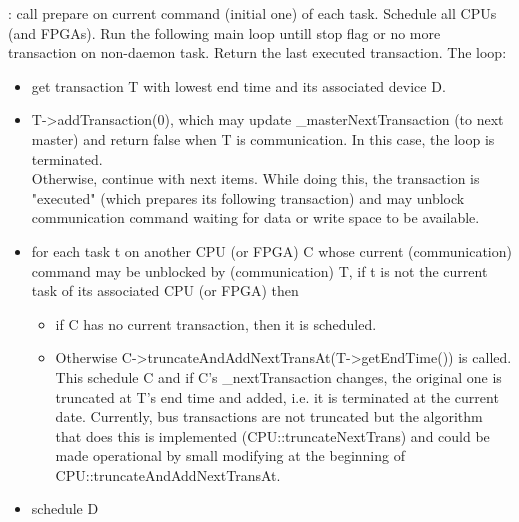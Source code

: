\documentclass[a4paper,11pt]{article}
\newcommand{\bfont}{\fontseries{b}\selectfont}
\newcommand{\cod}[1]{{\ttfamily #1}}
\newcommand{\method}[1]{\par\vspace{1mm}\hspace{-2mm}\colorbox{method}{\textopenbullet\bfont\cod{#1}:}}
\begin{document}
\method{simulate(oLastTrans)} call \cod{prepare} on current command (initial one) of each task. Schedule all CPUs (and FPGAs). Run the following main loop untill stop flag or no more transaction on non-daemon task. Return the last executed transaction. The loop:
\begin{itemize}
	\item get transaction \cod{T} with lowest end time and its associated device \cod{D}.
	\item \cod{T->addTransaction(0)}, which may update \cod{\_masterNextTransaction} (to next master) and return false when \cod{T} is communication. In this case, the loop is terminated.\\
	Otherwise, continue with next items. While doing this, the transaction is "executed" (which prepares its following transaction) and may unblock communication command waiting for data or write space to be available.
	\item for each task \cod{t} on another CPU (or FPGA) \cod{C} whose current (communication) command may be unblocked by (communication) \cod{T}, if \cod{t} is not the current task of its associated CPU (or FPGA) then
	\begin{itemize}
	\item if \cod{C} has no current transaction, then it is scheduled.
	\item Otherwise \cod{C->truncateAndAddNextTransAt(T->getEndTime())} is called. This schedule \cod{C} and if \cod{C}'s \cod{\_nextTransaction} changes, the original one is truncated at \cod{T}'s end time and added, i.e. it is terminated at the current date. Currently, bus transactions are not truncated but the algorithm that does this is implemented (\cod{CPU::truncateNextTrans}) and could be made operational by small modifying at the beginning of \cod{CPU::truncateAndAddNextTransAt}.
	\end{itemize}
	\item schedule \cod{D}
\end{itemize}
\end{document}
